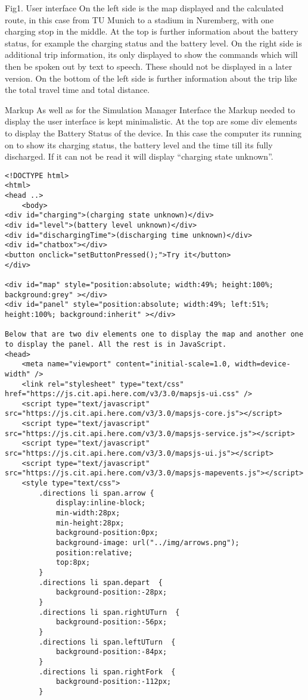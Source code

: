 Fig1. User interface
On the left side is the map displayed and the calculated route, in this case from TU Munich to a stadium in Nuremberg, with one charging stop in the middle. At the top is further information about the battery status, for example the charging status and the battery level. On the right side is additional trip information, its only displayed to show the commands which will then be spoken out by text to speech. These should not be displayed in a later version. On the bottom of the left side is further information about the trip like the total travel time and total distance. 




Markup
As well as for the Simulation Manager Interface the Markup needed to display the user interface is kept minimalistic. At the top are some div elements to display the Battery Status of the device. In this case the computer its running on to show its charging status, the battery level and the time till its fully discharged. If it can not be read it will display “charging state unknown”.

\begin{verbatim}
<!DOCTYPE html>
<html>
<head ..>
    <body>
<div id="charging">(charging state unknown)</div>
<div id="level">(battery level unknown)</div>
<div id="dischargingTime">(discharging time unknown)</div>
<div id="chatbox"></div>
<button onclick="setButtonPressed();">Try it</button>
</div>

<div id="map" style="position:absolute; width:49%; height:100%; background:grey" ></div>
<div id="panel" style="position:absolute; width:49%; left:51%; height:100%; background:inherit" ></div>

Below that are two div elements one to display the map and another one to display the panel. All the rest is in JavaScript. 
<head>
    <meta name="viewport" content="initial-scale=1.0, width=device-width" />
    <link rel="stylesheet" type="text/css" href="https://js.cit.api.here.com/v3/3.0/mapsjs-ui.css" />
    <script type="text/javascript" src="https://js.cit.api.here.com/v3/3.0/mapsjs-core.js"></script>
    <script type="text/javascript" src="https://js.cit.api.here.com/v3/3.0/mapsjs-service.js"></script>
    <script type="text/javascript" src="https://js.cit.api.here.com/v3/3.0/mapsjs-ui.js"></script>
    <script type="text/javascript" src="https://js.cit.api.here.com/v3/3.0/mapsjs-mapevents.js"></script>
    <style type="text/css">
        .directions li span.arrow {
            display:inline-block;
            min-width:28px;
            min-height:28px;
            background-position:0px;
            background-image: url("../img/arrows.png");
            position:relative;
            top:8px;
        }
        .directions li span.depart  {
            background-position:-28px;
        }
        .directions li span.rightUTurn  {
            background-position:-56px;
        }
        .directions li span.leftUTurn  {
            background-position:-84px;
        }
        .directions li span.rightFork  {
            background-position:-112px;
        }
\end{verbatim}


